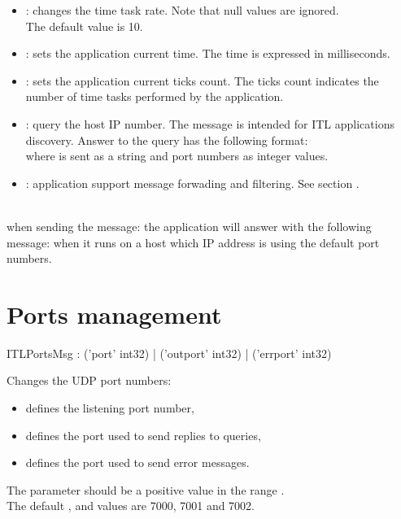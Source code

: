 \documentclass[a4paper,twoside]{report}
\newcommand{\sublevel}[1]	{\section{#1}}
\newcommand{\sampleindent}	{ \hspace{0.5cm} }
\begin{document}
\begin{itemize}
\item {}: changes the time task rate. Note that null values are ignored.\\
The default  value is 10.

\item {}: sets the application current time. The time is expressed in milliseconds.

\item {}: sets the application current ticks count. The ticks count indicates the number of time tasks performed by the application.

\item {}: query the host IP number. The message is intended for ITL applications discovery. Answer to the query has the following format: \\
\hspace*{1cm}  where  is sent as a string and port numbers as integer values.

\item {}: application support message forwading and filtering. See section .
\end{itemize}

\example \\
when sending the message:
\sampleindent the application will answer with the following message:
\sampleindent when it runs on a host which IP address is  using the default port numbers.

\sublevel{Ports management}
\label{ITLPorts}


\begin{rail}
ITLPortsMsg : ('port' int32)
		| ('outport' int32)
		| ('errport' int32)
\end{rail}

Changes the UDP port numbers:
\begin{itemize}
\item {} defines the listening port number, 
\item {} defines the port used to send replies to queries, 
\item {} defines the port used to send error messages. 
\end{itemize}
The  parameter should be a positive value in the range . \\
The default ,  and  values are 7000, 7001 and 7002.
\end{document}
